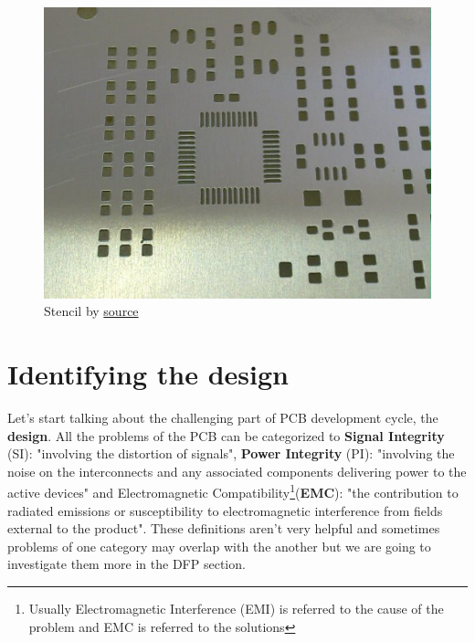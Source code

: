 \documentclass[final]{cubedoc}
\begin{document}
	
	\begin{figure}[h!]
		\centering
		\includegraphics[keepaspectratio, height = 0.25\textheight, width = \textwidth]{assets/solder_paste_stencil.jpg}
		\caption{Stencil by \href{https://www.itmconsulting.com/?product=stencilpro-3-0-stencil-aperture-calculator}{source}}
	\end{figure}
	
	\section{Identifying the design}
	
	
	Let's start talking about the challenging part of PCB development cycle, the \textbf{design}. All the problems of the PCB can be categorized to \textbf{Signal Integrity} (SI): "involving the distortion of signals", \textbf{Power Integrity} (PI): "involving the noise on the interconnects and any associated components delivering power to the active devices" and Electromagnetic Compatibility\footnote{Usually Electromagnetic Interference (EMI) is referred to the cause of the problem and EMC is referred to the solutions}(\textbf{EMC}): "the contribution to radiated emissions or susceptibility to electromagnetic interference from fields external to the product". These definitions aren't very helpful and sometimes problems of one category may overlap with the another but we are going to investigate them more in the DFP section.
	
\end{document}
